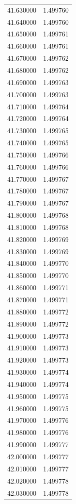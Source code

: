 \begin{tabular}{rr}
41.630000 & 1.499760 \\
41.640000 & 1.499760 \\
41.650000 & 1.499761 \\
41.660000 & 1.499761 \\
41.670000 & 1.499762 \\
41.680000 & 1.499762 \\
41.690000 & 1.499763 \\
41.700000 & 1.499763 \\
41.710000 & 1.499764 \\
41.720000 & 1.499764 \\
41.730000 & 1.499765 \\
41.740000 & 1.499765 \\
41.750000 & 1.499766 \\
41.760000 & 1.499766 \\
41.770000 & 1.499767 \\
41.780000 & 1.499767 \\
41.790000 & 1.499767 \\
41.800000 & 1.499768 \\
41.810000 & 1.499768 \\
41.820000 & 1.499769 \\
41.830000 & 1.499769 \\
41.840000 & 1.499770 \\
41.850000 & 1.499770 \\
41.860000 & 1.499771 \\
41.870000 & 1.499771 \\
41.880000 & 1.499772 \\
41.890000 & 1.499772 \\
41.900000 & 1.499773 \\
41.910000 & 1.499773 \\
41.920000 & 1.499773 \\
41.930000 & 1.499774 \\
41.940000 & 1.499774 \\
41.950000 & 1.499775 \\
41.960000 & 1.499775 \\
41.970000 & 1.499776 \\
41.980000 & 1.499776 \\
41.990000 & 1.499777 \\
42.000000 & 1.499777 \\
42.010000 & 1.499777 \\
42.020000 & 1.499778 \\
42.030000 & 1.499778 \\

\end{tabular}
